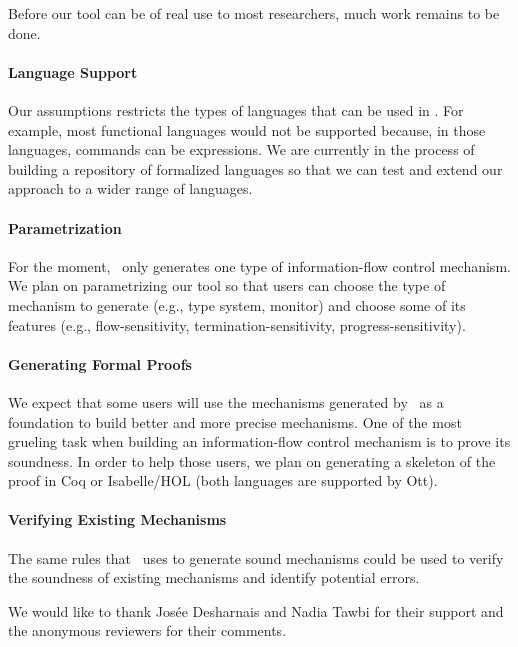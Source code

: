 \documentclass[sigplan,10pt]{acmart}\settopmatter{printfolios=true,printccs=false,printacmref=false}
\begin{document}
Before our tool can be of real use to most researchers, much work remains to be done.

\paragraph{Language Support} Our assumptions restricts the types of languages that can be used in \ottifc. For example, most functional languages would not be supported because, in those languages, commands can be expressions. We are currently in the process of building a repository of formalized languages so that we can test and extend our approach to a wider range of languages.

\paragraph{Parametrization} For the moment, \ottifc\ only generates one type of information-flow control mechanism. We plan on parametrizing our tool so that users can choose the type of mechanism to generate (e.g., type system, monitor) and choose some of its features (e.g., flow-sensitivity, termination-sensitivity, progress-sensitivity).

\paragraph{Generating Formal Proofs} We expect that some users will use the mechanisms generated by \ottifc\ as a foundation to build better and more precise mechanisms. One of the most grueling task when building an information-flow control mechanism is to prove its soundness. In order to help those users, we plan on generating a skeleton of the proof in Coq or Isabelle/HOL (both languages are supported by Ott).

\paragraph{Verifying Existing Mechanisms} The same rules that \ottifc\ uses to generate sound mechanisms could be used to verify the soundness of existing mechanisms and identify potential errors.

\begin{acks}
We would like to thank Josée Desharnais and Nadia Tawbi for their support and the anonymous reviewers for their comments.
\end{acks}


\end{document}
